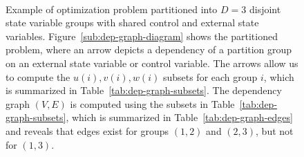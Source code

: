 \begin{figure}[t]
\centering
	\\
	\hfill%
    \caption{Example of optimization problem partitioned into $D=3$ disjoint state variable groups with shared control and external state variables. Figure~\ref{sub:dep-graph-diagram} shows the partitioned problem, where an arrow depicts a dependency of a partition group on an external state variable or control variable. The arrows allow us to compute the $u\left(i\right), v\left(i\right), w\left(i\right)$ subsets for each group $i$, which is summarized in Table~\ref{tab:dep-graph-subsets}. The dependency graph $(V,E)$ is computed using the subsets in Table~\ref{tab:dep-graph-subsets}, which is summarized in Table~\ref{tab:dep-graph-edges} and reveals that edges exist for groups $\left(1,2\right)$ and $\left(2,3\right)$, but not for $\left(1,3\right)$.}%
    \label{fig:dep-graph}
  \end{figure}


